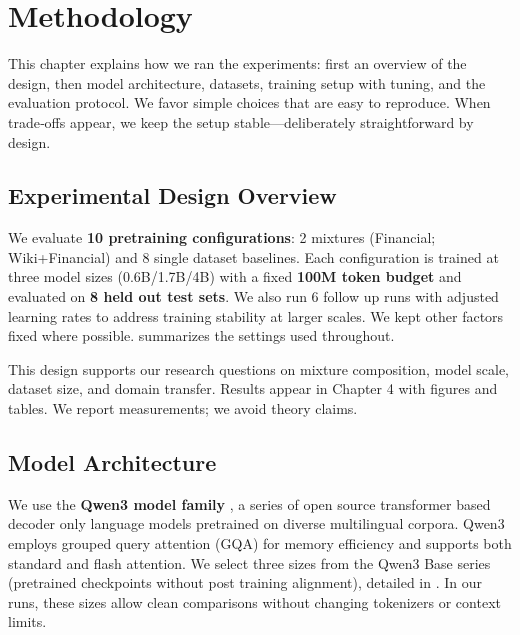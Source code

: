 \chapter{Methodology}

This chapter explains how we ran the experiments: first an overview of the design, then model architecture, datasets, training setup with tuning, and the evaluation protocol. We favor simple choices that are easy to reproduce. When trade‑offs appear, we keep the setup stable—deliberately straightforward by design.

\section{Experimental Design Overview}

We evaluate \textbf{10 pretraining configurations}: 2 mixtures (Financial; Wiki+Financial) and 8 single dataset baselines. Each configuration is trained at three model sizes (0.6B/1.7B/4B) with a fixed \textbf{100M token budget} and evaluated on \textbf{8 held out test sets}. We also run 6 follow up runs with adjusted learning rates to address training stability at larger scales. We kept other factors fixed where possible.  summarizes the settings used throughout.



This design supports our research questions on mixture composition, model scale, dataset size, and domain transfer. Results appear in Chapter 4 with figures and tables. We report measurements; we avoid theory claims.

\section{Model Architecture}

We use the \textbf{Qwen3 model family} \parencite{yang2024qwen2,qwen3}, a series of open source transformer based decoder only language models pretrained on diverse multilingual corpora. Qwen3 employs grouped query attention (GQA) for memory efficiency and supports both standard and flash attention. We select three sizes from the Qwen3 Base series (pretrained checkpoints without post training alignment), detailed in . In our runs, these sizes allow clean comparisons without changing tokenizers or context limits.


